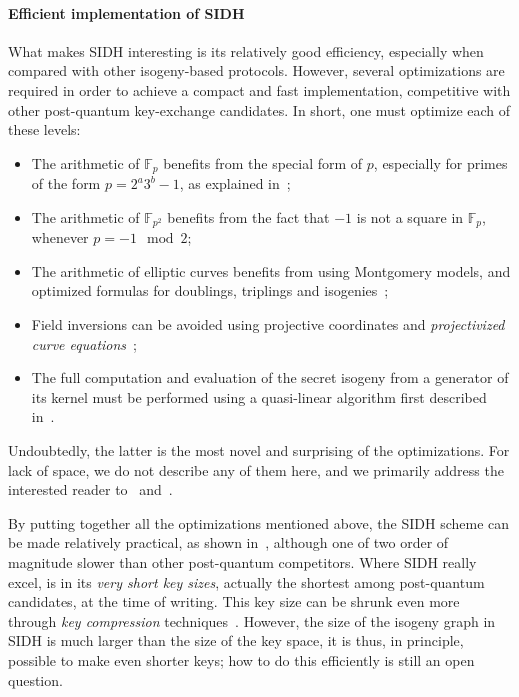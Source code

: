 \documentclass[10pt]{article}
\theoremstyle{plain}
\theoremstyle{definition}
\def\F{\ensuremath{\mathbb{F}}}
\begin{document}
\paragraph{Efficient implementation of SIDH}
What makes SIDH interesting is its relatively good efficiency,
especially when compared with other isogeny-based protocols. %
However, several optimizations are required in order to achieve a
compact and fast implementation, competitive with other post-quantum
key-exchange candidates. %
In short, one must optimize each of these levels:
\begin{itemize}
\item The arithmetic of $\F_p$ benefits from the special form of
  $p$, especially for primes of the form $p=2^a3^b-1$, as explained
  in~\cite{costello2016sidh,vercauteren-sidh-fp,cryptoeprint:2016:986};
\item The arithmetic of $\F_{p^2}$ benefits from the fact that $-1$ is
  not a square in $\F_p$, whenever $p=-1\mod 2$;
\item The arithmetic of elliptic curves benefits from using Montgomery
  models, and optimized formulas for doublings, triplings and
  isogenies~\cite{defeo+jao+plut12,costello2016sidh,cryptoeprint:2017:504};
\item Field inversions can be avoided using projective coordinates and
  \emph{projectivized curve equations}~\cite{costello2016sidh};
\item The full computation and evaluation of the secret isogeny from a
  generator of its kernel must be performed using a quasi-linear
  algorithm first described in~\cite{defeo+jao+plut12}.
\end{itemize}

Undoubtedly, the latter is the most novel and surprising of the
optimizations. %
For lack of space, we do not describe any of them here, and we
primarily address the interested reader to~\cite{defeo+jao+plut12}
and~\cite{costello2016sidh}.

By putting together all the optimizations mentioned above, the SIDH
scheme can be made relatively practical, as shown
in~\cite{defeo+jao+plut12,costello2016sidh}, although one of two order
of magnitude slower than other post-quantum competitors. %
Where SIDH really excel, is in its \emph{very short key sizes},
actually the shortest among post-quantum candidates, at the time of
writing. %
This key size can be shrunk even more through \emph{key compression}
techniques~\cite{azarderakhsh2016key,Costello2017}. %
However, the size of the isogeny graph in SIDH is much larger than the
size of the key space, it is thus, in principle, possible to make even
shorter keys; how to do this efficiently is still an open question.
\end{document}
